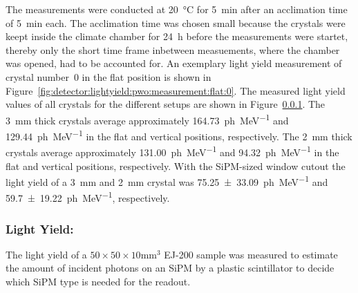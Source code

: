 The measurements were conducted at \SI{20}{\celsius} for \SI{5}{\minute} after an acclimation time of \SI{5}{\minute} each.
The acclimation time was chosen small because the crystals were keept inside the climate chamber for \SI{24}{\hour} before the measurements were startet, thereby only the short time frame inbetween measuements, where the chamber was opened, had to be accounted for.
An exemplary light yield measurement of crystal number~0 in the flat position is shown in Figure~\ref{fig:detector:lightyield:pwo:measurement:flat:0}.
The measured light yield values of all crystals for the different setups are shown in Figure~\ref{}.
The \SI{3}{\milli\meter} thick crystals average approximately \SI{164.73}{ph\per\mega\electronvolt} and \SI{129.44}{ph\per\mega\electronvolt} in the flat and vertical positions, respectively.
The \SI{2}{\milli\meter} thick crystals average approximately \SI{131.00}{ph\per\mega\electronvolt} and \SI{94.32}{ph\per\mega\electronvolt} in the flat and vertical positions, respectively.
With the SiPM-sized window cutout the light yield of a \SI{3}{\milli\meter} and \SI{2}{\milli\meter} crystal was \SI{75.25\pm 33.09}{ph\per\mega\electronvolt} and \SI{59.7\pm 19.22}{ph\per\mega\electronvolt}, respectively.

\subsubsection{Light Yield: }
The light yield of a $50 \times 50 \times 10 \si{\milli\meter\cubed}$ EJ-200 sample was measured to estimate the amount of incident photons on an SiPM by a plastic scintillator to decide which SiPM type is needed for the readout.

  

